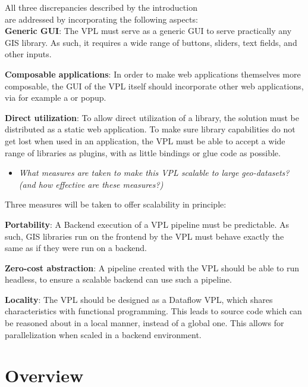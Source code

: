 All three discrepancies described by the introduction \\ are addressed by incorporating the following aspects: \\

\textbf{Generic GUI}: The VPL must serve as a generic \ac{GUI} to serve practically any \ac{GIS} library. 
As such, it requires a wide range of buttons, sliders, text fields, and other inputs.

\textbf{Composable applications}: In order to make web applications themselves more composable, the \ac{GUI} of the VPL itself should incorporate other web applications, via for example a  or popup.

\textbf{Direct utilization}: To allow direct utilization of a library, the solution must be distributed as a static web application. 
To make sure library capabilities do not get lost when used in an application, the VPL must be able to accept a wide range of libraries as plugins, with as little bindings or glue code as possible.


\begin{itemize}[ ]
  \item \emph{What measures are taken to make this VPL scalable to large geo-datasets? (and how
  effective are these measures?)}
\end{itemize}

Three measures will be taken to offer scalability in principle: 

\textbf{Portability}: A Backend execution of a VPL pipeline must be predictable. 
As such, GIS libraries run on the frontend by the VPL must behave exactly the same as if they were run on a backend. 

\textbf{Zero-cost abstraction}: A pipeline created with the VPL should be able to run headless, to ensure a scalable backend can use such a pipeline.

\textbf{Locality}: The VPL should be designed as a Dataflow VPL, which shares characteristics with functional programming. This leads to source code which can be reasoned about in a local manner, instead of a global one. This allows for parallelization when scaled in a backend environment.

\section{Overview}

\graphicspath{{../../assets/images/1/}}

